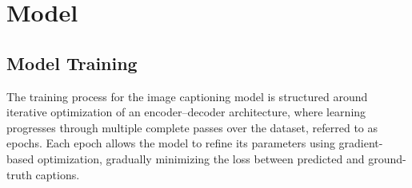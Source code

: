\section{Model}

\subsection{Model Training}

The training process for the image captioning model is structured around iterative optimization of an encoder--decoder architecture, where learning progresses through multiple complete passes over the dataset, referred to as epochs. Each epoch allows the model to refine its parameters using gradient-based optimization, gradually minimizing the loss between predicted and ground-truth captions.

